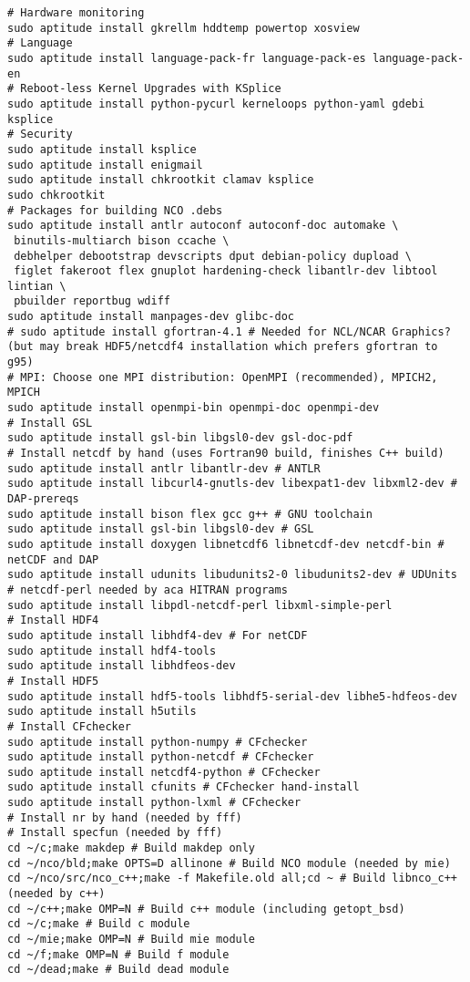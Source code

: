 \documentclass[12pt,twoside]{article}
\begin{document}
\begin{verbatim}
# Hardware monitoring 
sudo aptitude install gkrellm hddtemp powertop xosview
# Language
sudo aptitude install language-pack-fr language-pack-es language-pack-en
# Reboot-less Kernel Upgrades with KSplice
sudo aptitude install python-pycurl kerneloops python-yaml gdebi ksplice
# Security
sudo aptitude install ksplice
sudo aptitude install enigmail
sudo aptitude install chkrootkit clamav ksplice
sudo chkrootkit
# Packages for building NCO .debs
sudo aptitude install antlr autoconf autoconf-doc automake \
 binutils-multiarch bison ccache \
 debhelper debootstrap devscripts dput debian-policy dupload \
 figlet fakeroot flex gnuplot hardening-check libantlr-dev libtool lintian \
 pbuilder reportbug wdiff
sudo aptitude install manpages-dev glibc-doc
# sudo aptitude install gfortran-4.1 # Needed for NCL/NCAR Graphics? (but may break HDF5/netcdf4 installation which prefers gfortran to g95)
# MPI: Choose one MPI distribution: OpenMPI (recommended), MPICH2, MPICH
sudo aptitude install openmpi-bin openmpi-doc openmpi-dev
# Install GSL
sudo aptitude install gsl-bin libgsl0-dev gsl-doc-pdf
# Install netcdf by hand (uses Fortran90 build, finishes C++ build)
sudo aptitude install antlr libantlr-dev # ANTLR
sudo aptitude install libcurl4-gnutls-dev libexpat1-dev libxml2-dev # DAP-prereqs
sudo aptitude install bison flex gcc g++ # GNU toolchain
sudo aptitude install gsl-bin libgsl0-dev # GSL
sudo aptitude install doxygen libnetcdf6 libnetcdf-dev netcdf-bin # netCDF and DAP
sudo aptitude install udunits libudunits2-0 libudunits2-dev # UDUnits
# netcdf-perl needed by aca HITRAN programs
sudo aptitude install libpdl-netcdf-perl libxml-simple-perl
# Install HDF4
sudo aptitude install libhdf4-dev # For netCDF
sudo aptitude install hdf4-tools 
sudo aptitude install libhdfeos-dev
# Install HDF5
sudo aptitude install hdf5-tools libhdf5-serial-dev libhe5-hdfeos-dev
sudo aptitude install h5utils
# Install CFchecker
sudo aptitude install python-numpy # CFchecker
sudo aptitude install python-netcdf # CFchecker
sudo aptitude install netcdf4-python # CFchecker
sudo aptitude install cfunits # CFchecker hand-install
sudo aptitude install python-lxml # CFchecker
# Install nr by hand (needed by fff)
# Install specfun (needed by fff)
cd ~/c;make makdep # Build makdep only
cd ~/nco/bld;make OPTS=D allinone # Build NCO module (needed by mie)
cd ~/nco/src/nco_c++;make -f Makefile.old all;cd ~ # Build libnco_c++ (needed by c++)
cd ~/c++;make OMP=N # Build c++ module (including getopt_bsd)
cd ~/c;make # Build c module
cd ~/mie;make OMP=N # Build mie module
cd ~/f;make OMP=N # Build f module
cd ~/dead;make # Build dead module

\end{verbatim}
\end{document}
